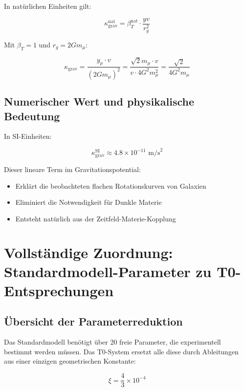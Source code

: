 	In natürlichen Einheiten gilt:
	
	\begin{equation}
		\kappa_{\text{grav}}^{\text{nat}} = \beta_T^{\text{nat}} \cdot \frac{yv}{r_g^2}
	\end{equation}
	
	Mit $\beta_T = 1$ und $r_g = 2Gm_\mu$:
	
	\begin{equation}
		\kappa_{\text{grav}} = \frac{y_\mu \cdot v}{(2Gm_\mu)^2} = \frac{\sqrt{2} m_\mu \cdot v}{v \cdot 4G^2m_\mu^2} = \frac{\sqrt{2}}{4G^2m_\mu}
	\end{equation}
	
	\subsection{Numerischer Wert und physikalische Bedeutung}
	
	In SI-Einheiten:
	
	\begin{equation}
		\kappa_{\text{grav}}^{\text{SI}} \approx 4.8 \times 10^{-11} \text{ m/s}^2
	\end{equation}
	
	Dieser lineare Term im Gravitationspotential:
	\begin{itemize}
		\item Erklärt die beobachteten flachen Rotationskurven von Galaxien
		\item Eliminiert die Notwendigkeit für Dunkle Materie
		\item Entsteht natürlich aus der Zeitfeld-Materie-Kopplung
	\end{itemize}
	
\section{Vollständige Zuordnung: Standardmodell-Parameter zu T0-Entsprechungen}
\label{sec:sm_t0_mapping}

\subsection{Übersicht der Parameterreduktion}
\label{subsec:parameter_overview}

Das Standardmodell benötigt über 20 freie Parameter, die experimentell bestimmt werden müssen. Das T0-System ersetzt alle diese durch Ableitungen aus einer einzigen geometrischen Konstante:

\begin{equation}
	\boxed{\xi = \frac{4}{3} \times 10^{-4}}
\end{equation}

